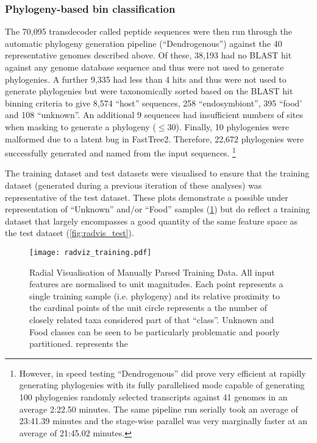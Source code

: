 \subsubsection{Phylogeny-based bin classification}
The 70,095 transdecoder called peptide sequences were then run through
the automatic phylogeny generation pipeline (``Dendrogenous'') against the 40
representative genomes described above. 
Of these, 38,193 had no BLAST hit against any genome database sequence and thus were
not used to generate phylogenies.  A further 9,335 had less than 4 hits 
and thus were not used to generate phylogenies but were taxonomically sorted based
on the BLAST hit binning criteria to give 8,574 ``host'' sequences,  258 ``endosymbiont'',
395 ``food' and 108 ``unknown''.   
An additional 9 sequences had insufficient numbers of sites 
when masking to generate a phylogeny (\(\leq30\)).  Finally, 10 phylogenies
were malformed due to a latent bug in FastTree2.  
Therefore, 22,672 phylogenies were successfully generated and named from the input sequences.
\footnote{However, in speed testing ``Dendrogenous'' did prove very efficient at rapidly generating phylogenies with its
	fully parallelised mode capable of generating 100 phylogenies randomly selected transcripts against 41 genomes in an average 2:22.50 minutes.
	The same pipeline run serially took an average of 23:41.39 minutes and the stage-wise parallel was very marginally faster at 
	an average of 21:45.02 minutes.}

The training dataset and test datasets were visualised to ensure that the training dataset 
(generated during a previous iteration of these analyses) was representative of the 
test dataset.   These plots demonstrate a possible under representation of ``Unknown'' and/or ``Food'' samples (\cref{fig:radvis_training}) but do reflect a training dataset that largely encompasses a good quantity of the same
feature space as the test dataset (\cref{fig:radvis_test}).

\begin{figure}[h]
		\centering
		\texttt{[image: radviz\_training.pdf]}
		\caption{Radial Visualisation of Manually Parsed Training Data. All input features are normalised to 
			unit magnitudes.  Each point represents a single training sample (i.e. phylogeny) and its relative proximity
			to the cardinal points of the unit circle represents a the number of closely related taxa considered part of
			that ``class''.  Unknown and Food classes can be seen to be particularly problematic and poorly partitioned.
			represents the}
		\label{fig:radvis_training}
	\end{figure}

